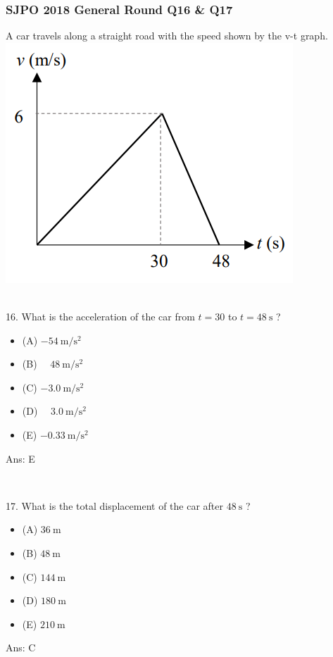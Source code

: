 \documentclass{article}
\begin{document}
\subsubsection{SJPO 2018 General Round Q16 \& Q17}
A car travels along a straight road with the speed shown by the 
v-t graph. \\ \includegraphics[width=0.5\linewidth]{images/2018q16.png} \\
\\
\begin{samepage}
16. What is the acceleration of the car from $t=30$ to $t=48 \mathrm{~s}$ ?
\begin{itemize}
\item[] (A) $-54 \mathrm{~m} / \mathrm{s}^2$ 
\item[] (B) $\quad 48 \mathrm{~m} / \mathrm{s}^2$ 
\item[] (C) $-3.0 \mathrm{~m} / \mathrm{s}^2$ 
\item[] (D) $\quad 3.0 \mathrm{~m} / \mathrm{s}^2$
\item[] (E) $-0.33 \mathrm{~m} / \mathrm{s}^2$\end{itemize}
Ans: E
\end{samepage}
\\[20pt]
\begin{samepage}
17. What is the total displacement of the car after $48 \mathrm{~s}$ ?
\begin{itemize}
\item[] (A) $36 \mathrm{~m}$
\item[] (B) $48 \mathrm{~m}$
\item[] (C) $144 \mathrm{~m}$
\item[] (D) $180 \mathrm{~m}$
\item[] (E) $210 \mathrm{~m}$ 
\end{itemize}
Ans: C\\
\end{samepage}
\\
\end{document}
